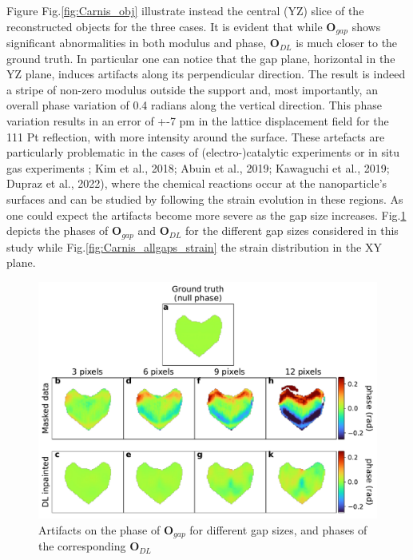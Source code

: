 Figure Fig.\ref{fig:Carnis_obj} illustrate instead the central (YZ) slice of the reconstructed objects for 
the three cases. It is evident that while $\textbf{O}_{gap}$ shows significant abnormalities in both modulus and phase, 
$\textbf{O}_{DL}$ is much closer to the ground truth. In particular one can notice that the gap plane, horizontal in the 
YZ plane, induces artifacts along its perpendicular direction. The result is indeed a stripe of non-zero modulus outside 
the support and, most importantly, an overall phase variation of 0.4 radians along the vertical direction. This phase variation
results in an error of +-7 pm in the lattice displacement field for the 111 Pt reflection, with more intensity around the 
surface. These artefacts are particularly problematic in the cases of (electro-)catalytic experiments \cite{atlan_imaging_2023}
or in situ gas experiments \cite{Ulvestad2015}; Kim et al., 2018; Abuin et al., 2019; Kawaguchi et al., 2019; Dupraz et al., 2022), 
where the chemical reactions occur at the nanoparticle's surfaces and can be studied by following the strain evolution in these
regions. As one could expect the artifacts become more severe as the gap size increases. Fig.\ref{fig:Carnis_allgaps} depicts 
the phases of $\textbf{O}_{gap}$ and $\textbf{O}_{DL}$ for the different gap sizes considered in this study while 
Fig.\ref{fig:Carnis_allgaps_strain} the strain distribution in the XY plane. 

\begin{figure}[ht]
    \centering
    \includegraphics[width=\textwidth]{figures/Inpainting/strain_comparison_allGaps-1.pdf}
    \caption{Artifacts on the phase of $\textbf{O}_{gap}$ for different gap sizes, and phases of the corresponding $\textbf{O}_{DL}$  }
    \label{fig:Carnis_allgaps}
\end{figure}


